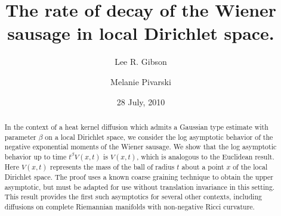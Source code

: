 \documentclass[letterpaper,oneside,english]{amsart}
\begin{document}
\title{The rate of decay of the Wiener sausage in local Dirichlet space.}
\author{Lee R. Gibson \and Melanie Pivarski}
\address{Lee R. Gibson, Department of Mathematics,
University of Louisville, Louisville, KY 40292 \\
Tel.: +1-502-852-6826, Fax: +1-502-852-7132 \\ 
lee.gibson@louisville.edu
and
Melanie Pivarski,  
Department of Mathematics and Actuarial Science,
Roosevelt University, 
430 S. Michigan Ave,
Chicago, IL 60605\\
mpivarski@roosevelt.edu
}
\date{28 July, 2010}
\begin{abstract}
In the context of a heat kernel diffusion which admits a Gaussian type estimate with parameter $\beta$ on a local Dirichlet space, we consider the log asymptotic behavior of the negative exponential moments of the Wiener sausage.  We show that the log asymptotic behavior up to time $t^{\beta}V(x,t)$ is $V(x,t)$, which is analogous to the Euclidean  result.  Here $V(x,t)$ represents the mass of the ball of radius $t$ about a point $x$ of the local Dirichlet space.  The proof uses a known coarse graining technique to obtain the upper asymptotic, but must be adapted for use without translation invariance in this setting.  This result provides the first such asymptotics for several other contexts, including diffusions on complete Riemannian manifolds with non-negative Ricci curvature.
\end{abstract}

\maketitle
\end{document}
